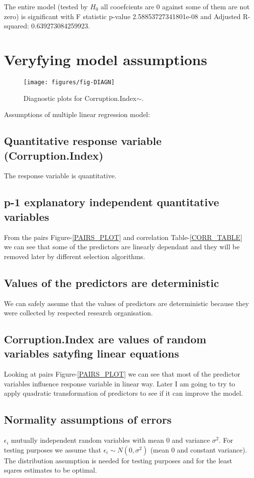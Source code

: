 \documentclass[a4paper]{article}
\begin{document}
The entire model (tested by $H_0$ all cooefcients are 0 against some of them are not
zero) is significant with F statistic p-value
2.58853727341801e-08
and Adjusted R-squared: 0.639273084259923.


\section{Veryfying model assumptions}

\begin{figure}[H]
\begin{center}
\texttt{[image: figures/fig-DIAGN]}
\caption{Diagnostic plots for Corruption.Index$\sim .$}
\end{center}
\end{figure}

Assumptions of multiple linear regression model:
\subsection{Quantitative response variable (Corruption.Index)} 
The response variable is quantitative.
\subsection{p-1 explanatory independent quantitative variables}
From the pairs Figure-\ref{PAIRS_PLOT} and correlation Table-\ref{CORR_TABLE} we can see
that some of the predictors are linearly dependant and they will be removed later by different selection
algorithms.
\subsection{Values of the predictors are deterministic}
We can safely assume that the values of predictors are deterministic because
they were collected by respected research organisation. 
\subsection{Corruption.Index are values of random variables satyfing
linear equations}
Looking at pairs Figure-\ref{PAIRS_PLOT} we can see that most of the predictor
variables influence response variable in linear way. Later I am going to try to
apply quadratic transformation of predictors to see if it can improve the model.
\subsection{Normality assumptions of errors}
  $\epsilon_i$ mutually independent random variables with mean 0 and
  variance $\sigma^2$. For testing purposes we assume that $\epsilon_i \sim
  N(0,\sigma^2)$ (mean 0 and constant variance). The distribution assumption is
  needed for testing purposes and for the least sqares estimates to be optimal.
  
\end{document}
